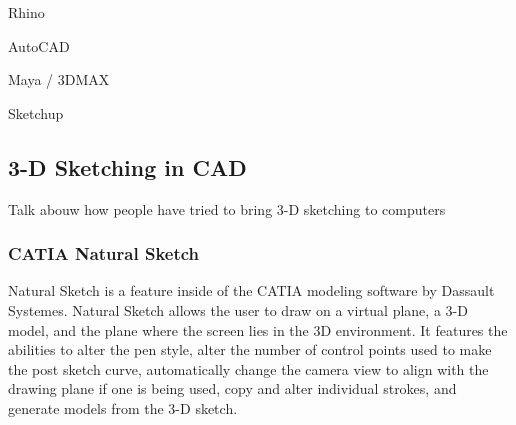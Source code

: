 \documentclass[12pt]{article}
\begin{document}
Rhino

AutoCAD

Maya / 3DMAX

Sketchup

\subsection{3-D Sketching in CAD}

Talk abouw how people have tried to bring 3-D sketching to computers

\subsubsection{CATIA Natural Sketch}

Natural Sketch is a feature inside of the CATIA modeling software by Dassault Systemes. Natural Sketch allows the user to draw on a virtual plane, a 3-D model, and the plane where the screen lies in the 3D environment. It features the abilities to alter the pen style, alter the number of control points used to make the post sketch curve, automatically change the camera view to align with the drawing plane if one is being used, copy and alter individual strokes, and generate models from the 3-D sketch.
\end{document}
